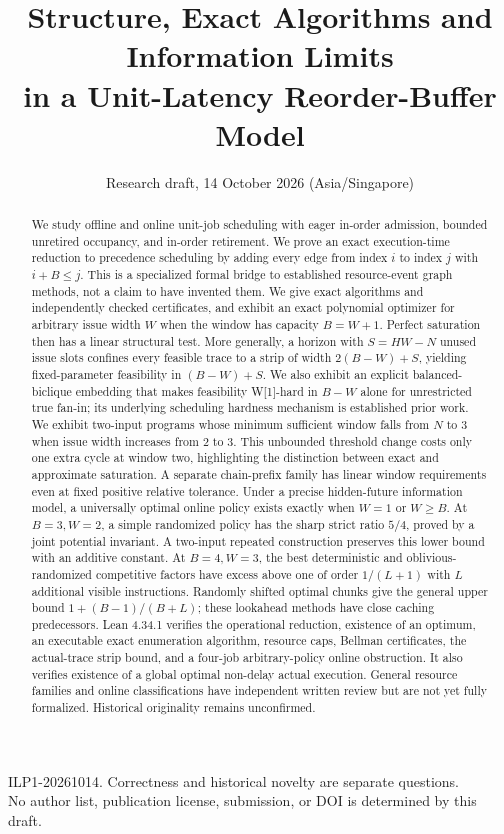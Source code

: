 \documentclass[11pt]{article}
\title{Structure, Exact Algorithms and Information Limits\\in a Unit-Latency Reorder-Buffer Model}
\author{}
\date{Research draft, 14 October 2026 (Asia/Singapore)}
\begin{document}
\maketitle
\vspace{-2em}
\begin{center}\small ILP1-20261014. Correctness and historical novelty are separate questions.\\
No author list, publication license, submission, or DOI is determined by this draft.
\end{center}
\begin{abstract}
We study offline and online unit-job scheduling with eager in-order admission,
bounded unretired occupancy, and in-order retirement. We prove an exact
execution-time reduction to precedence scheduling by adding every edge from
index $i$ to index $j$ with $i+B\le j$. This is a specialized formal bridge
to established resource-event graph methods, not a claim to have invented them.
We give exact algorithms and independently checked certificates, and exhibit
an exact polynomial optimizer for arbitrary issue width $W$ when the window
has capacity $B=W+1$. Perfect saturation then has a linear structural test.
More generally, a horizon with $S=HW-N$ unused issue slots confines every
feasible trace to a strip of width $2(B-W)+S$, yielding fixed-parameter
feasibility in $(B-W)+S$. We also exhibit
an explicit balanced-biclique embedding that makes feasibility W[1]-hard
in $B-W$ alone for unrestricted true fan-in; its underlying scheduling
hardness mechanism is established prior work. We exhibit
two-input programs whose minimum sufficient window falls from $N$ to $3$ when
issue width increases from $2$ to $3$. This unbounded threshold change costs
only one extra cycle at window two, highlighting the distinction between
exact and approximate saturation. A separate chain-prefix family has linear
window requirements even at fixed positive relative tolerance. Under a precise hidden-future information
model, a universally optimal online policy exists exactly when $W=1$ or
$W\ge B$. At $B=3,W=2$, a simple randomized policy has the sharp strict
ratio $5/4$, proved by a joint potential invariant. A two-input repeated
construction preserves this lower bound with an additive constant.
At $B=4,W=3$, the best deterministic and oblivious-randomized competitive
factors have excess above one of order $1/(L+1)$ with $L$ additional visible
instructions. Randomly shifted optimal chunks give the general upper bound
$1+(B-1)/(B+L)$; these lookahead methods have close caching predecessors.
Lean 4.34.1 verifies the operational reduction, existence of an
optimum, an executable exact enumeration algorithm, resource caps, Bellman
certificates, the actual-trace strip bound, and a four-job arbitrary-policy online obstruction.
It also verifies existence of a global optimal non-delay actual execution.
General resource families and online classifications have independent written review
but are not yet fully formalized. Historical originality remains unconfirmed.
\end{abstract}
\end{document}
